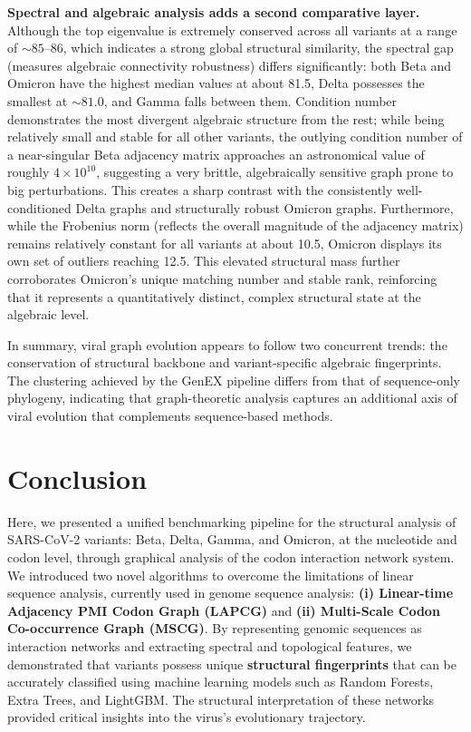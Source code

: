 \documentclass[conference]{IEEEtran}
\begin{document}
\textbf{Spectral and algebraic analysis adds a second comparative layer.} Although the top eigenvalue is extremely conserved across all variants at a range of $\sim 85$--$86$, which indicates a strong global structural similarity, the spectral gap (measures algebraic connectivity robustness) differs significantly: both Beta and Omicron have the highest median values at about 81.5, Delta possesses the smallest at $\sim 81.0$, and Gamma falls between them. Condition number demonstrates the most divergent algebraic structure from the rest; while being relatively small and stable for all other variants, the outlying condition number of a near-singular Beta adjacency matrix approaches an astronomical value of roughly $4 \times 10^{10}$, suggesting a very brittle, algebraically sensitive graph prone to big perturbations. This creates a sharp contrast with the consistently well-conditioned Delta graphs and structurally robust Omicron graphs. Furthermore, while the Frobenius norm (reflects the overall magnitude of the adjacency matrix) remains relatively constant for all variants at about 10.5, Omicron displays its own set of outliers reaching 12.5. This elevated structural mass further corroborates Omicron's unique matching number and stable rank, reinforcing that it represents a quantitatively distinct, complex structural state at the algebraic level.

In summary, viral graph evolution appears to follow two concurrent trends: the conservation of structural backbone and variant-specific algebraic fingerprints. The clustering achieved by the GenEX pipeline differs from that of sequence-only phylogeny, indicating that graph-theoretic analysis captures an additional axis of viral evolution that complements sequence-based methods.


\section{Conclusion}
\label{sec:conclusion}
Here, we presented a unified benchmarking pipeline for the structural analysis of SARS-CoV-2 variants: Beta, Delta, Gamma, and Omicron, at the nucleotide and codon level, through graphical analysis of the codon interaction network system. We introduced two novel algorithms to overcome the limitations of linear sequence analysis, currently used in genome  sequence analysis: \textbf{(i) Linear-time Adjacency PMI Codon Graph (LAPCG)} and \textbf{(ii) Multi-Scale Codon Co-occurrence Graph (MSCG)}. By representing genomic sequences as interaction networks and extracting spectral and topological features, we demonstrated that variants possess unique \textbf{structural fingerprints} that can be accurately classified using machine learning models such as Random Forests, Extra Trees, and LightGBM. The structural interpretation of these networks provided critical insights into the virus's evolutionary trajectory.
\end{document}
